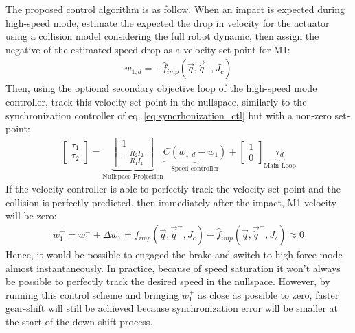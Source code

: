 The proposed control algorithm is as follow. When an impact is expected during high-speed mode, estimate the expected the drop in velocity for the actuator using a collision model considering the full robot dynamic, then assign the negative of the estimated speed drop as a velocity set-point for M1:
%
\begin{align}
w_{1,d}  = -\hat{f}_{imp}( \vec{q} , \vec{\dot{q}}^- , J_c ) 
\label{eq:dsdm_impact_gen_delta_w1}
\end{align}
%
Then, using the optional secondary objective loop of the high-speed mode controller, track this velocity set-point in the nullspace, similarly to the synchronization controller of eq. \eqref{eq:syncrhonization_ctl} but with a non-zero set-point:
%
\begin{align}
\left[ \begin{array}{c}
\tau_1 \\
\tau_2
\end{array} \right]
 = 
\underbrace{\left[ \begin{array}{c}
1 \\
-\frac{R_2 I_2}{R_1 I_1} 
\end{array} \right]}_{\text{Nullspace Projection}} \underbrace{C (w_{1,d} -  w_1)}_{\text{Speed controller}} + 
\left[ \begin{array}{c}
1 \\
0 
\end{array} \right]  \underbrace{ \tau_d }_{\text{Main Loop}}
\end{align}
%
If the velocity controller is able to perfectly track the velocity set-point and the collision is perfectly predicted, then immediately after the impact, M1 velocity will be zero:
%
\begin{align}
w_1^+ =  w_1^- + \Delta w_1 = f_{imp}( \vec{q} , \vec{\dot{q}}^- , J_c ) -\hat{f}_{imp}( \vec{q} , \vec{\dot{q}}^- , J_c ) \approx 0
\label{eq:dsdm_impact_vel}
\end{align}
%
Hence, it would be possible to engaged the brake and switch to high-force mode almost instantaneously. In practice, because of speed saturation it won't always be possible to perfectly track the desired speed in the nullspace. However, by running this control scheme and bringing $w_1^+$ as close as possible to zero,  faster gear-shift will still be achieved because synchronization error will be smaller at the start of the down-shift process.



